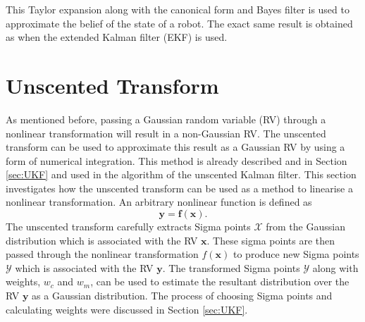 \documentclass[12pt,oneside,openany,a4paper, %
afrikaans,english,
]{memoir}
\numberwithin{equation}{chapter}
\begin{document}
{This Taylor expansion along with the canonical form and Bayes filter is used to approximate the belief of the state of a robot. The exact same result is obtained as when the extended Kalman filter (EKF) is used.

\section{Unscented Transform}
As mentioned before, passing a Gaussian random variable (RV) through a nonlinear transformation will result in a non-Gaussian RV. The unscented transform can be used to approximate this result as a Gaussian RV by using a form of numerical integration. This method is already described and in Section \ref{sec:UKF} and used in the algorithm of the unscented Kalman filter. This section investigates how the unscented transform can be used as a method to linearise a nonlinear transformation. An arbitrary nonlinear function is defined as 
\begin{equation}\label{eq:randomNonlinear}
\bm{y} = \bm{f}(\bm{x}).
\end{equation}
The unscented transform carefully extracts Sigma points $\mathcal{X}$ from the Gaussian distribution which is associated with the RV $\bm{x}$. These sigma points are then passed through the nonlinear transformation $f(\bm{x})$ to produce new Sigma points $\mathcal{Y}$ which is associated with the RV $\bm{y}$. The transformed Sigma points $\mathcal{Y}$ along with weights, $w_c$ and $w_m$, can be used to estimate the resultant distribution over the RV $\bm{y}$ as a Gaussian distribution. The process of choosing Sigma points and calculating weights were discussed in Section \ref{sec:UKF}.

}
\end{document}
